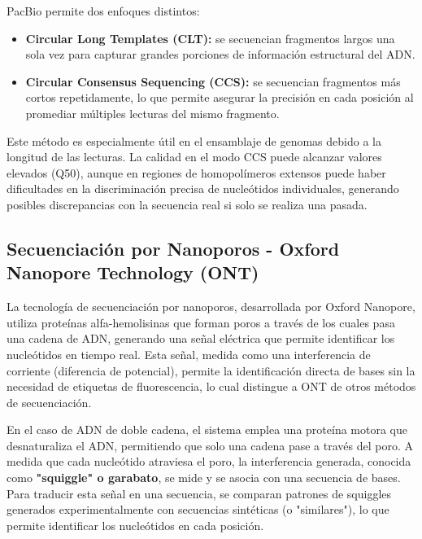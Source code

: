 PacBio permite dos enfoques distintos:
\begin{itemize}
\item \textbf{Circular Long Templates (CLT):} se secuencian fragmentos largos una sola vez para capturar grandes porciones de información estructural del ADN.
\item \textbf{Circular Consensus Sequencing (CCS):} se secuencian fragmentos más cortos repetidamente, lo que permite asegurar la precisión en cada posición al promediar múltiples lecturas del mismo fragmento.
\end{itemize}

Este método es especialmente útil en el ensamblaje de genomas debido a la longitud de las lecturas. La calidad en el modo CCS puede alcanzar valores elevados (Q50), aunque en regiones de homopolímeros extensos puede haber dificultades en la discriminación precisa de nucleótidos individuales, generando posibles discrepancias con la secuencia real si solo se realiza una pasada.

\subsection{Secuenciación por Nanoporos - Oxford Nanopore Technology (ONT)}
La tecnología de secuenciación por nanoporos, desarrollada por Oxford Nanopore, utiliza proteínas alfa-hemolisinas que forman poros a través de los cuales pasa una cadena de ADN, generando una señal eléctrica que permite identificar los nucleótidos en tiempo real. Esta señal, medida como una interferencia de corriente (diferencia de potencial), permite la identificación directa de bases sin la necesidad de etiquetas de fluorescencia, lo cual distingue a ONT de otros métodos de secuenciación.

En el caso de ADN de doble cadena, el sistema emplea una proteína motora que desnaturaliza el ADN, permitiendo que solo una cadena pase a través del poro. A medida que cada nucleótido atraviesa el poro, la interferencia generada, conocida como \textbf{"squiggle" o garabato}, se mide y se asocia con una secuencia de bases. Para traducir esta señal en una secuencia, se comparan patrones de squiggles generados experimentalmente con secuencias sintéticas (o "similares"), lo que permite identificar los nucleótidos en cada posición.

